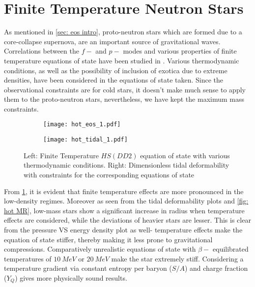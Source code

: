 \documentclass[a4paper,12pt,onehalfspacing]{report}
\begin{document}
\FloatBarrier

\section{Finite Temperature Neutron Stars}

As mentioned in \cref{sec: eos intro}, proto-neutron stars which are formed due to a core-collapse supernova, are an important source of gravitational waves. Correlations between the $f-$ and $p-$ modes and various properties of finite temperature equations of state have been studied in \cite{thapaFrequenciesOscillationModes2023}. Various thermodynamic conditions, as well as the possibility of inclusion of exotica due to extreme densities, have been considered in the equations of state taken. Since the observational constraints are for cold stars, it doesn't make much sense to apply them to the proto-neutron stars, nevertheless, we have kept the maximum mass constraints.  

\begin{figure}[ht]
    \centering
    \begin{subfigure}{0.5\textwidth}
      \centering
      \texttt{[image: hot\_eos\_1.pdf]}
    \end{subfigure}%
    \begin{subfigure}{0.5\textwidth}
      \centering
      \texttt{[image: hot\_tidal\_1.pdf]}
    \end{subfigure}
    \caption{Left: Finite Temperature $HS(DD2)$ equation of state with various thermodynamic conditions. Right: Dimensionless tidal deformability with constraints for the corresponding equations of state}
    \label{fig: hot eos tide 1}
\end{figure}

From \cref{fig: hot eos tide 1}, it is evident that finite temperature effects are more pronounced in the low-density regimes. Moreover as seen from the tidal deformability plots and \cref{fig: hot MR}, low-mass stars show a significant increase in radius when temperature effects are considered, while the deviations of heavier stars are lesser. This is clear from the pressure VS energy density plot as well- temperature effects make the equation of state stiffer, thereby making it less prone to gravitational compressions. Comparatively unrealistic equations of state with $\beta-$ equilibrated temperatures of $10\  MeV$ or $20\ MeV$ make the star extremely stiff. Considering a temperature gradient via constant entropy per baryon ($S/A$) and charge fraction ($Y_Q$) gives more physically sound results.
\end{document}
